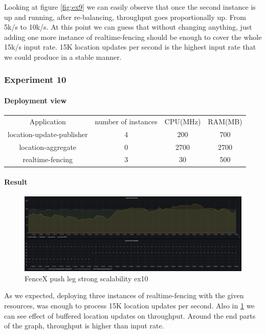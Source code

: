 \documentclass[a4]{report}
\begin{document}
        Looking at figure \ref{fig:ex9} we can easily observe that once the second instance is up and running, after
        re-balancing, throughput goes proportionally up.
        From 5k/s to 10k/s.
        At this point we can guess that without changing anything, just adding one more instance of realtime-fencing
        should be enough to cover the whole 15k/s input rate.
        15K location updates per second is the highest input rate that we could produce in a stable manner.

        \clearpage

        \subsubsection{Experiment 10}

        \paragraph{Deployment view}
        \begin{center}
            \begin{tabular}{ c c c c }
                Application               & number of instances & CPU(MHz) & RAM(MB) \\
                location-update-publisher & 4                   & 200      & 700     \\
                location-aggregate        & 0                   & 2700     & 2700    \\
                realtime-fencing          & 3                   & 30       & 500     \\
            \end{tabular}
        \end{center}

        \paragraph{Result}
        \begin{figure}[ht]
            \caption{FenceX push leg strong scalability ex10}
            \label{fig:ex10}
            \includegraphics[scale=0.4]{images/evaluation/ex10-benchmarking-ongoing-2per4sec.png}
        \end{figure}
        As we expected, deploying three instances of realtime-fencing with the given resources, was enough to process 15K
        location updates per second.
        Also in \ref{fig:ex10} we can see effect of buffered location updates on throughput.
        Around the end parts of the graph, throughput is higher than input rate.
\end{document}
